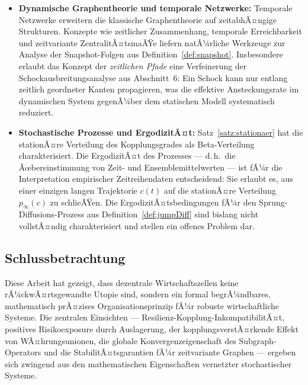 ﻿\documentclass[a4paper,12pt]{article}
\theoremstyle{definition}
\begin{document}
\begin{itemize}
    \item \textbf{Dynamische Graphentheorie und temporale Netzwerke:}
          Temporale Netzwerke \citep{holme2012temporal} erweitern die klassische
          Graphentheorie auf zeitabhÃ¤ngige Strukturen. Konzepte wie zeitlicher
          Zusammenhang, temporale Erreichbarkeit und zeitvariante ZentralitÃ¤tsmaÃŸe
          liefern natÃ¼rliche Werkzeuge zur Analyse der Snapshot-Folgen aus
          Definition~\ref{def:snapshot}. Insbesondere erlaubt das Konzept der
          \emph{zeitlichen Pfade} eine Verfeinerung der Schockausbreitungsanalyse
          aus Abschnitt~6: Ein Schock kann nur entlang zeitlich geordneter Kanten
          propagieren, was die effektive Ansteckungsrate im dynamischen System
          gegenÃ¼ber dem statischen Modell systematisch reduziert.

    \item \textbf{Stochastische Prozesse und ErgodizitÃ¤t:}
          Satz~\ref{satz:stationaer} hat die stationÃ¤re Verteilung des
          Kopplungsgrades als Beta-Verteilung charakterisiert. Die ErgodizitÃ¤t
          des Prozesses --- d.\,h.\ die Ãœbereinstimmung von Zeit- und
          Ensemblemittelwerten --- ist fÃ¼r die Interpretation empirischer
          Zeitreihendaten entscheidend: Sie erlaubt es, aus einer einzigen
          langen Trajektorie $c(t)$ auf die stationÃ¤re Verteilung $p_\infty(c)$
          zu schlieÃŸen. Die ErgodizitÃ¤tsbedingungen fÃ¼r den Sprung-Diffusions-Prozess
          aus Definition~\ref{def:jumpDiff} sind bislang nicht vollstÃ¤ndig
          charakterisiert und stellen ein offenes Problem dar.
\end{itemize}

\subsection{Schlussbetrachtung}

Diese Arbeit hat gezeigt, dass dezentrale Wirtschaftszellen keine rÃ¼ckwÃ¤rtsgewandte Utopie
sind, sondern ein formal begrÃ¼ndbares, mathematisch prÃ¤zises Organisationsprinzip fÃ¼r
robuste wirtschaftliche Systeme. Die zentralen Einsichten --- Resilienz-Kopplung-InkompatibilitÃ¤t,
positives Risikoexposure durch Auslagerung, der kopplungsverstÃ¤rkende Effekt von
WÃ¤hrungsunionen, die globale Konvergenzeigenschaft des Subgraph-Operators und die
StabilitÃ¤tsgarantien fÃ¼r zeitvariante Graphen --- ergeben sich zwingend aus den
mathematischen Eigenschaften vernetzter stochastischer Systeme.
\end{document}
